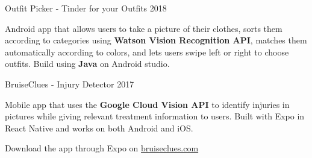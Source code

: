 \begin{cventries}
  \cventry
    {Outfit Picker - Tinder for your Outfits} %
    {} %
    {} %
    {2018} %
    {
      \begin{cvitems} %
        \item {Android app that allows users to take a picture of their clothes, sorts them according to categories using \textbf{Watson Vision  Recognition API}, matches them automatically according to colors, and lets users swipe left or right to choose outfits. Build using \textbf{Java} on Android studio.}
      \end{cvitems}
    }

  \cventry
    {BruiseClues - Injury Detector} %
    {} %
    {} %
    {2017} %
    {
      \begin{cvitems} %
        \item {Mobile app that uses the \textbf{Google Cloud Vision API} to identify injuries in pictures while giving relevant treatment information to users. Built with Expo in React Native and works on both Android and iOS.}
        \item {Download the app through Expo on \href{http://bruiseclues.com}{bruiseclues.com}}
      \end{cvitems}
    }

\end{cventries}
